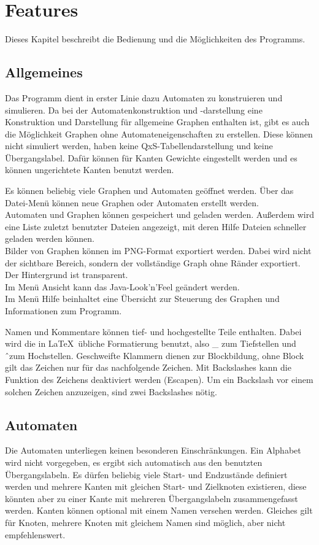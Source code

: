 \chapter{Features}\label{Features}
Dieses Kapitel beschreibt die Bedienung und die Möglichkeiten des Programms.
\section{Allgemeines}
Das Programm dient in erster Linie dazu Automaten zu konstruieren und simulieren. Da bei der Automatenkonstruktion und -darstellung eine Konstruktion und Darstellung für allgemeine Graphen enthalten ist, gibt es auch die Möglichkeit Graphen ohne Automateneigenschaften zu erstellen. Diese können nicht simuliert werden, haben keine QxS-Tabellendarstellung und keine Übergangslabel. Dafür können für Kanten Gewichte eingestellt werden und es können ungerichtete Kanten benutzt werden.

Es können beliebig viele Graphen und Automaten geöffnet werden.
Über das Datei-Menü können neue Graphen oder Automaten erstellt werden.\\
Automaten und Graphen können gespeichert und geladen werden. Außerdem wird eine Liste zuletzt benutzter Dateien angezeigt, mit deren Hilfe Dateien schneller geladen werden können.\\
Bilder von Graphen können im PNG-Format exportiert werden. Dabei wird nicht der sichtbare Bereich, sondern der vollständige Graph ohne Ränder exportiert. Der Hintergrund ist transparent.\\
Im Menü Ansicht kann das Java-Look'n'Feel geändert werden.\\
Im Menü Hilfe beinhaltet eine Übersicht zur Steuerung des Graphen und Informationen zum Programm.

Namen und Kommentare können tief- und hochgestellte Teile enthalten. Dabei wird die in \LaTeX \ übliche Formatierung benutzt, also \_ zum Tiefstellen und \^\  zum Hochstellen. Geschweifte Klammern dienen zur Blockbildung, ohne Block gilt das Zeichen nur für das nachfolgende Zeichen. Mit Backslashes kann die Funktion des Zeichens deaktiviert werden (Escapen). Um ein Backslash vor einem solchen Zeichen anzuzeigen, sind zwei Backslashes nötig.
\section{Automaten}
Die Automaten unterliegen keinen besonderen Einschränkungen. Ein Alphabet wird nicht vorgegeben, es ergibt sich automatisch aus den benutzten Übergangslabeln. Es dürfen beliebig viele Start- und Endzustände definiert werden und mehrere Kanten mit gleichen Start- und Zielknoten existieren, diese könnten aber zu einer Kante mit mehreren Übergangslabeln zusammengefasst werden. Kanten können optional mit einem Namen versehen werden. Gleiches gilt für Knoten, mehrere Knoten mit gleichem Namen sind möglich, aber nicht empfehlenswert.

